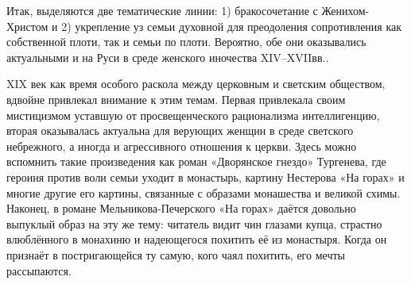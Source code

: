 Итак, выделяются две тематические линии: 1) бракосочетание с Женихом-Христом и 2) укрепление уз семьи духовной для преодоления сопротивления как собственной плоти, так и семьи по плоти.
Вероятно, обе они оказывались актуальными и на Руси в среде женского иночества XIV--XVIIвв..

XIX век как время особого раскола между церковным и светским обществом, вдвойне привлекал внимание к этим темам.
Первая привлекала своим мистицизмом уставшую от просвещенческого рационализма интеллигенцию, вторая оказывалась актуальна для верующих женщин в среде светского небрежного, а иногда и агрессивного отношения к церкви.
Здесь можно вспомнить такие произведения как роман «Дворянское гнездо» Тургенева, где героиня против воли семьи уходит в монастырь, картину Нестерова «На горах» и многие другие его картины, связанные с образами монашества и великой схимы.
Наконец, в романе Мельникова-Печерского «На горах» даётся довольно выпуклый образ на эту же тему: читатель видит чин глазами купца, страстно влюблённого в монахиню и надеющегося похитить её из монастыря.
Когда он признаёт в постригающейся ту самую, кого чаял похитить, его мечты рассыпаются.

